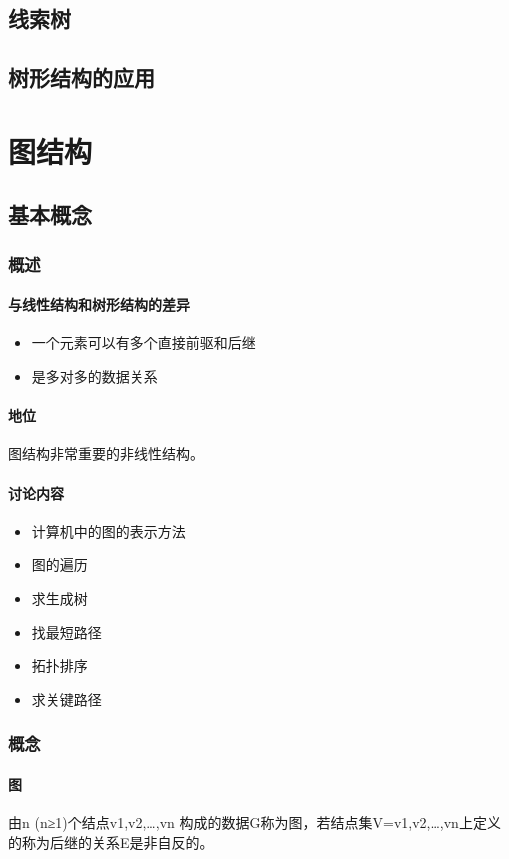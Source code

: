 \documentclass[AutoFakeBold]{LZUThesis2007}
\begin{document}
	\section{线索树}
	\section{树形结构的应用}

\chapter{图结构}
	\section{基本概念}
		\subsection{概述}
			\subsubsection{与线性结构和树形结构的差异}
				\begin{itemize}
					\item 一个元素可以有多个直接前驱和后继
					\item 是多对多的数据关系
				\end{itemize}
			\subsubsection{地位}
		
				图结构非常重要的非线性结构。
			\subsubsection{讨论内容}
				\begin{itemize}
					\item 计算机中的图的表示方法
					\item 图的遍历
					\item 求生成树
					\item 找最短路径
					\item 拓扑排序
					\item 求关键路径
				\end{itemize}
		\subsection{概念}
			\subsubsection{图}
由n (n≥1)个结点v1,v2,…,vn 构成的数据G称为图，若结点集V={v1,v2,…,vn}上定义的称为后继的关系E是非自反的。
\end{document}
